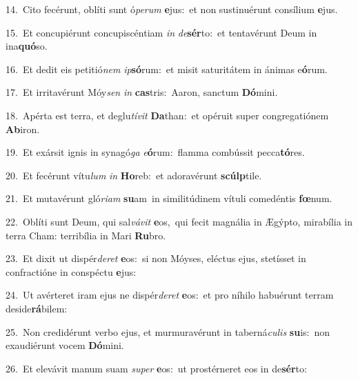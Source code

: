 {\numbfont\textcolor{\numbcolor}{14.}}~Cito fecérunt, oblíti sunt ó\-\textit{pe}\-\textit{rum} \textbf{e}\-jus:~\star et non sustinuérunt consílium \textbf{e}\-jus.\par
{\numbfont\textcolor{\numbcolor}{15.}}~Et concupiérunt concupiscéntiam \textit{in} \textit{de}\-\textbf{sér}to:~\star et tentavérunt Deum in ina\-\textbf{quó}\-so.\par
{\numbfont\textcolor{\numbcolor}{16.}}~Et dedit eis petitió\textit{nem} \textit{ip}\-\textbf{só}rum:~\star et misit saturitátem in ánimas e\-\textbf{ó}\-rum.\par
{\numbfont\textcolor{\numbcolor}{17.}}~Et irritavérunt Móy\textit{sen} \textit{in} \textbf{cas}\-tris:~\star Aaron, sanctum \textbf{Dó}\-mini.\par
{\numbfont\textcolor{\numbcolor}{18.}}~Apérta est terra, et deglu\-\textit{tí}\-\textit{vit} \textbf{Da}\-than:~\star et opéruit super congregatiónem \textbf{Ab}\-iron.\par
{\numbfont\textcolor{\numbcolor}{19.}}~Et exársit ignis in synagó\textit{ga} \textit{e}\-\textbf{ó}rum:~\star flamma combússit pecca\-\textbf{tó}\-res.\par
{\numbfont\textcolor{\numbcolor}{20.}}~Et fecérunt vítu\textit{lum} \textit{in} \textbf{Ho}\-reb:~\star et adoravérunt \textbf{scúlp}\-tile.\par
{\numbfont\textcolor{\numbcolor}{21.}}~Et mutavérunt gló\-\textit{ri}\-\textit{am} \textbf{su}\-am~\star in similitúdinem vítuli comedéntis \textbf{fœ}\-num.\par
{\numbfont\textcolor{\numbcolor}{22.}}~Oblíti sunt Deum, qui sal\-\textit{vá}\-\textit{vit} \textbf{e}\-os,~\star qui fecit magnália in Ægýpto, mirabília in terra Cham: terribília in Mari \textbf{Ru}\-bro.\par
{\numbfont\textcolor{\numbcolor}{23.}}~Et dixit ut dispér\-\textit{de}\-\textit{ret} \textbf{e}\-os:~\star si non Móyses, eléctus ejus, stetísset in confractióne in conspéctu \textbf{e}\-jus:\par
{\numbfont\textcolor{\numbcolor}{24.}}~Ut avérteret iram ejus ne dispér\-\textit{de}\-\textit{ret} \textbf{e}\-os:~\star et pro níhilo habuérunt terram deside\-\textbf{rá}\-bilem:\par
{\numbfont\textcolor{\numbcolor}{25.}}~Non credidérunt verbo ejus, et murmuravérunt in taberná\-\textit{cu}\-\textit{lis} \textbf{su}\-is:~\star non exaudiérunt vocem \textbf{Dó}\-mini.\par
{\numbfont\textcolor{\numbcolor}{26.}}~Et elevávit manum suam \textit{su}\-\textit{per} \textbf{e}\-os:~\star ut prostérneret eos in de\-\textbf{sér}\-to:\par
